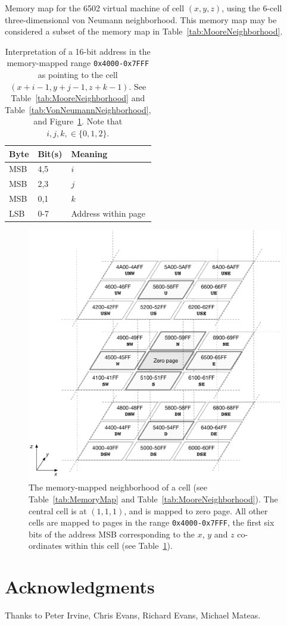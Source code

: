 \documentclass{article}
\newcommand\hex[1]{{\tt 0x#1}}
\newcommand\hexrange[2]{\hex{#1}{\tt -}\hex{#2}}
\begin{document}
\begin{table}
\vonneumannmap
\caption{
  \label{tab:VonNeumannNeighborhood}
  Memory map for the 6502 virtual machine of cell $(x,y,z)$,
  using the 6-cell three-dimensional von Neumann neighborhood.
  This memory map may be considered a subset of the memory map in Table~\ref{tab:MooreNeighborhood}.
  \asslabels
}
\end{table}

\begin{table}
\begin{tabular}{lll}
  \hline
  Byte & Bit(s) & Meaning \\
  \hline
  MSB & 4,5 & $i$ \\
  MSB & 2,3 & $j$ \\
  MSB & 0,1 & $k$ \\
  LSB & 0-7 & Address within page \\
  \hline
\end{tabular}
\caption{
  Interpretation of a 16-bit address in the memory-mapped range \hexrange{4000}{7FFF}
  as pointing to the cell $(x+i-1,y+j-1,z+k-1)$.
  See Table~\ref{tab:MooreNeighborhood} and Table~\ref{tab:VonNeumannNeighborhood}, and Figure~\ref{fig:UnitCube}.
  Note that $i,j,k, \in \{ 0,1,2 \}$.
  \label{tab:AddressBits}
}
\end{table}

\begin{figure}
  \includegraphics[width=\textwidth]{unitcube.pdf}
\caption{
  The memory-mapped neighborhood of a cell (see Table~\ref{tab:MemoryMap} and Table~\ref{tab:MooreNeighborhood}).
  The central cell is at $(1,1,1)$, and is mapped to zero page.
  All other cells are mapped to pages in the range \hexrange{4000}{7FFF},
  the first six bits of the address MSB corresponding to the $x$, $y$ and $z$ co-ordinates within this cell (see Table~\ref{tab:AddressBits}).
  \asslabels
  \label{fig:UnitCube}
}
\end{figure}

\section*{Acknowledgments}
Thanks to Peter Irvine, Chris Evans, Richard Evans, Michael Mateas.



\end{document}
